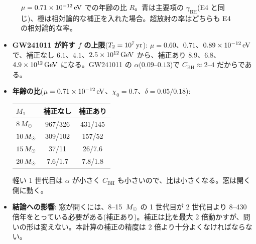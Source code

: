 \begin{figure}[H]
\centering

\caption{$\mu=0.71\times10^{-12}\,\mathrm{eV}$ での年齢の比 $R$。青は主要項の $\gamma_\mathrm{BH}$(E4 と同じ)、橙は相対論的な補正を入れた場合。超放射の率はどちらも E4 の相対論的な率。}
\label{fig:e07}
\end{figure}

\begin{result}
\begin{itemize}
\item \textbf{GW241011 が許す $f$ の上限}($T_2=10^7\,\mathrm{yr}$): $\mu=0.60$、$0.71$、$0.89\times10^{-12}\,\mathrm{eV}$ で、補正なし $6.1$、$4.1$、$2.5\times10^{12}\,\mathrm{GeV}$ から、補正あり $8.9$、$6.8$、$4.9\times10^{12}\,\mathrm{GeV}$ になる。GW241011 の $\alpha$($0.09$--$0.13$)で $C_\mathrm{BH}\approx2$--$4$ だからである。
\item \textbf{年齢の比}($\mu=0.71\times10^{-12}\,\mathrm{eV}$、$\chi_0=0.7$、$\delta=0.05/0.18$):
  \begin{center}
  \begin{tabular}{@{}lcc@{}}
  \toprule
  $M_1$ & 補正なし & 補正あり \\
  \midrule
  $8\,M_\odot$ & 967/326 & 431/145 \\
  $10\,M_\odot$ & 309/102 & 157/52 \\
  $15\,M_\odot$ & 37/11 & 26/7.6 \\
  $20\,M_\odot$ & 7.6/1.7 & 7.8/1.8 \\
  \bottomrule
  \end{tabular}
  \end{center}
  軽い 1 世代目は $\alpha$ が小さく $C_\mathrm{BH}$ も小さいので、比は小さくなる。窓は開く側に動く。
\item \textbf{結論への影響}: 窓が開くには、8--15 $\,M_\odot$ の 1 世代目が 2 世代目より 8--430 倍年をとっている必要がある(補正あり)。補正は比を最大 2 倍動かすが、問いの形は変えない。本計算の補正の精度は 2 倍より十分よくなければならない。
\end{itemize}
\end{result}
